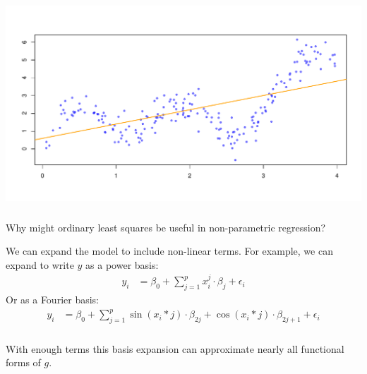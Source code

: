 \documentclass[xetex,mathserif,serif,aspectratio=169]{beamer}
\begin{document}
\begin{frame}[fragile] \frametitle{} \oldB \small

\begin{center}
\includegraphics[width=\textwidth]{img/olsSimple.pdf}
\end{center}

\end{frame}

\begin{frame}[fragile] \frametitle{} \oldB \small


Why might ordinary least squares be useful in non-parametric
regression? \pause {}

\pause We can expand the model to include non-linear terms.
For example, we can expand to write $y$ as a power basis:
\begin{align*}
y_i &= \beta_0 + \sum_{j=1}^p x_i^j \cdot \beta_j + \epsilon_i
\end{align*}
Or as a Fourier basis:
\begin{align*}
y_i &= \beta_0 + \sum_{j=1}^p \sin(x_i * j) \cdot \beta_{2j} + \cos(x_i * j) \cdot \beta_{2j+1} + \epsilon_i
\end{align*}

\end{frame}

\begin{frame}[fragile] \frametitle{} \oldB \small


With enough terms this basis expansion can approximate nearly
all functional forms of $g$.

\end{frame}
\end{document}
